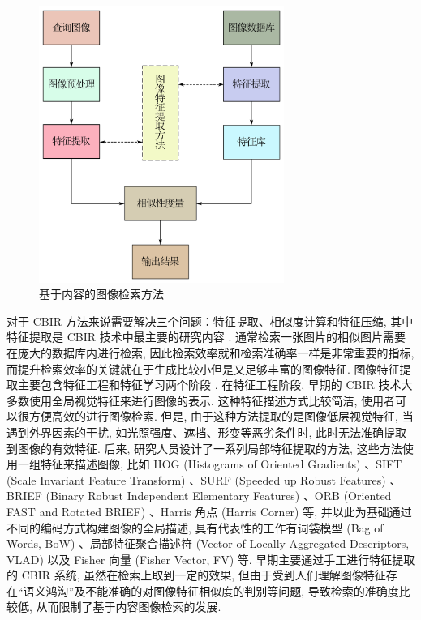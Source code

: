 \documentclass[12pt]{article}
\begin{document}
\begin{figure}[htbp]
  \centering
  \includegraphics[width=8cm]{CBIR.png}
  \caption{基于内容的图像检索方法}
  \label{fig:CBIR}
\end{figure}

对于 CBIR 方法来说需要解决三个问题：特征提取、相似度计算和特征压缩, 其中特征提取是 CBIR 技术中最主要的研究内容 \cite{Smeulders2000Content}. 通常检索一张图片的相似图片需要在庞大的数据库内进行检索, 因此检索效率就和检索准确率一样是非常重要的指标, 而提升检索效率的关键就在于生成比较小但是又足够丰富的图像特征. 图像特征提取主要包含特征工程和特征学习两个阶段 \cite{Chen2021Deep}. 在特征工程阶段, 早期的 CBIR 技术大多数使用全局视觉特征来进行图像的表示. 这种特征描述方式比较简洁, 使用者可以很方便高效的进行图像检索. 但是, 由于这种方法提取的是图像低层视觉特征, 当遇到外界因素的干扰, 如光照强度、遮挡、形变等恶劣条件时, 此时无法准确提取到图像的有效特征. 后来, 研究人员设计了一系列局部特征提取的方法, 这些方法使用一组特征来描述图像, 比如 HOG (Histograms of Oriented Gradients) \cite{Dalal2005Histograms}、SIFT (Scale Invariant Feature Transform) \cite{Lowe1999Object}、SURF (Speeded up Robust  Features) \cite{Bay2006Surf}、BRIEF (Binary 
Robust Independent Elementary Features) \cite{Calonder2010Brief}、ORB (Oriented FAST and Rotated BRIEF) \cite{Rublee2011Orb}、Harris 角点 (Harris Corner) \cite{Harris1988Combined} 等, 并以此为基础通过不同的编码方式构建图像的全局描述, 具有代表性的工作有词袋模型 (Bag of Words, BoW) \cite{Sivic2008Efficient}、局部特征聚合描述符 (Vector of Locally Aggregated Descriptors, VLAD) \cite{Jegou2010Aggregating} 以及 Fisher 向量 (Fisher Vector, FV) \cite{Perronnin2007Fisher} 等. 早期主要通过手工进行特征提取的 CBIR 系统, 虽然在检索上取到一定的效果, 但由于受到人们理解图像特征存在“语义鸿沟”及不能准确的对图像特征相似度的判别等问题, 导致检索的准确度比较低, 从而限制了基于内容图像检索的发展. 
\end{document}
